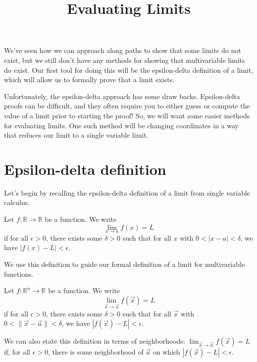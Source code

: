 \documentclass{ximera}
\title{Evaluating Limits}
\begin{document}
\begin{abstract}
\end{abstract}
\maketitle

We've seen how we can approach along paths to show that some limits do not exist, but we still don't have any methods for showing that multivariable limits do exist. Our first tool for doing this will be the epsilon-delta definition of a limit, which will allow us to formally prove that a limit exists.

Unfortunately, the epsilon-delta approach has some draw backs. Epsilon-delta proofs can be difficult, and they often require you to either guess or compute the value of a limit prior to starting the proof! So, we will want some easier methods for evaluating limits. One such method will be changing coordinates in a way that reduces our limit to a single variable limit.

\section*{Epsilon-delta definition}

Let's begin by recalling the epsilon-delta definition of a limit from single variable calculus.

\begin{definition}
Let $f:\mathbb{R}\rightarrow\mathbb{R}$ be a function. We write
\[
\lim_{x\rightarrow a} f(x) = L
\]
if for all $\epsilon >0$, there exists some $\delta >0$ such that for all $x$ with $0 < |x-a| < \delta$, we have $|f(x)-L| < \epsilon$.
\end{definition}

We use this definition to guide our formal definition of a limit for multivariable functions.

\begin{definition}
Let $f:\mathbb{R}^n\rightarrow\mathbb{R}$ be a function. We write
\[
\lim_{\vec{x}\rightarrow \vec{a}} f(\vec{x}) = L
\]
if for all $\epsilon >0$, there exists some $\delta >0$ such that for all $\vec{x}$ with $0 < \|\vec{x}-\vec{a}\| < \delta$, we have $|f(\vec{x})-L| < \epsilon$.

We can also state this definition in terms of neighborhoods: $\lim_{\vec{x}\rightarrow \vec{a}} f(\vec{x}) = L$ if, for all $\epsilon>0$, there is some neighborhood of $\vec{a}$ on which $|f(\vec{x})-L| < \epsilon$.
\end{definition}
\end{document}
